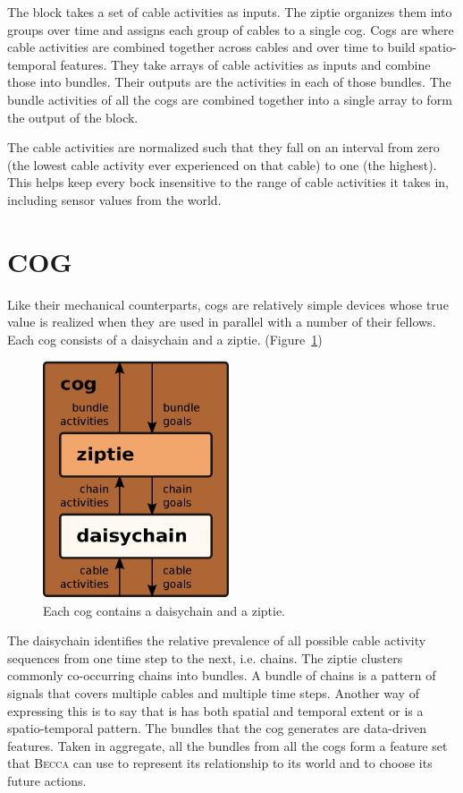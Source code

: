 \documentclass[oneside,twocolumn]{article}
\begin{document}
The block takes a set of cable activities as inputs. The ziptie organizes them into groups over time and assigns each group of cables to a single cog. Cogs are where cable activities are combined together across cables and over time to build spatio-temporal features. They take arrays of cable activities as inputs and combine those into bundles. Their outputs are the activities in each of those bundles. The bundle activities of all the cogs are combined together into a single array to form the output of the block.

The cable activities are normalized such that they fall on an interval from zero (the lowest cable activity ever experienced on that cable) to one (the highest). This helps keep every bock  insensitive to the range of cable activities it takes in, including sensor values from the world.

\section*{\color{copper} COG}

Like their mechanical counterparts, cogs are relatively simple devices whose true value is realized when they are used in parallel with a number of their fellows. Each cog consists of a daisychain and a ziptie. (Figure~\ref{cog}) 

\begin{figure}[ht]
\centering
\includegraphics[height=7.0cm]{figs/cog.png}
\caption{Each cog contains a daisychain and a ziptie.}
\label{cog}
\end{figure}

The daisychain identifies the relative prevalence of all possible cable activity sequences from one time step to the next, i.e. chains. The ziptie clusters commonly co-occurring chains into bundles. A bundle of chains is a pattern of signals that covers multiple cables and multiple time steps. Another way of expressing this is to say that is has both spatial and temporal extent or is a spatio-temporal pattern. The bundles that the cog generates are data-driven features. Taken in aggregate, all the bundles from all the cogs form a feature set that \textsc{Becca} can use to represent its relationship to its world and to choose its future actions. 
\end{document}
